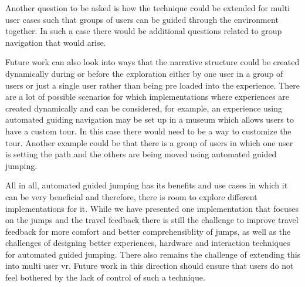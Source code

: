Another question to be asked is how the technique could be extended for multi user cases such that groups of users can be guided through the environment together. In such a case there would be additional questions related to group navigation that would arise.

Future work can also look into ways that the narrative structure could be created dynamically during or before the exploration either by one user in a group of users or just a single user rather than being pre loaded into the experience. There are a lot of possible scenarios for which implementations where experiences are created dynamically and can be considered, for example, an experience using automated guiding navigation may be set up in a museum which allows users to have a custom tour. In this case there would need to be a way to customize the tour. Another example could be that there is a group of users in which one user is setting the path and the others are being moved using automated guided jumping.

All in all, automated guided jumping has its benefits and use cases in which it can be very beneficial and therefore, there is room to explore different implementations for it. While we have presented one implementation that focuses on the jumps and the travel feedback there is still the challenge to improve travel feedback for more comfort and better comprehensiblity of jumps, as well as the challenges of designing better experiences, hardware and interaction techniques for automated guided jumping. There also remains the challenge of extending this into multi user \acrshort{vr}. Future work in this direction should ensure that users do not feel bothered by the lack of control of such a technique.

 